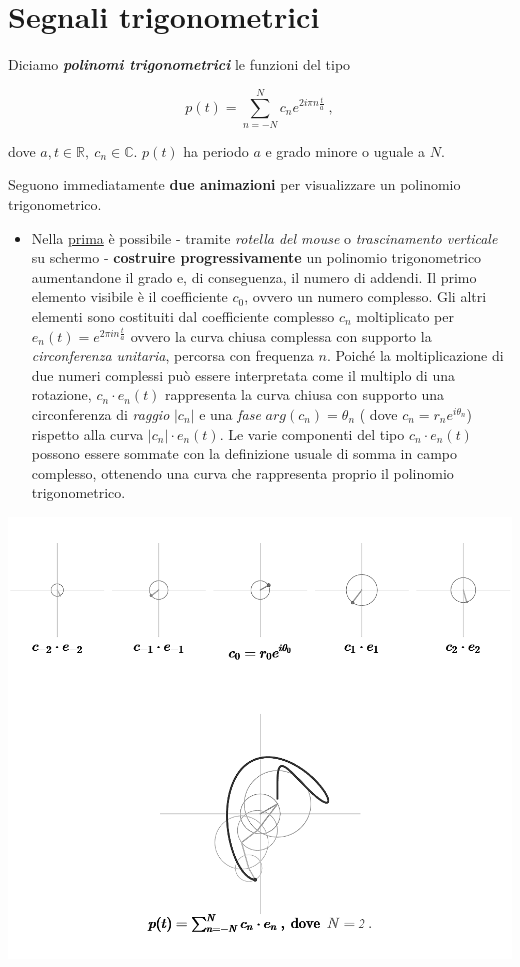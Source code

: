 \documentclass[
]{book}
\providecommand{\tightlist}{%
  \setlength{\itemsep}{0pt}\setlength{\parskip}{0pt}}
\begin{document}
\hypertarget{segntrig}{%
\section{Segnali trigonometrici}\label{segntrig}}

Diciamo \emph{\textbf{polinomi trigonometrici}} le funzioni del tipo

\begin{equation}
  p(t) = \sum_{n=-N}^N c_n e^{2 i \pi n \textstyle \frac {t}{a}} \ ,
  \label{eq:poltrig}
\end{equation}

dove \(a,t \in \mathbb{R}, \ c_n \in \mathbb{C}\). \(p(t)\) ha periodo \(a\) e grado minore o uguale a \(N\).

Seguono immediatamente \textbf{due animazioni} per visualizzare un polinomio trigonometrico.

\begin{itemize}
\tightlist
\item
  Nella \href{https://bradwave.github.io/thesis/animations/s2-animation.html}{prima} è possibile - tramite \emph{rotella del mouse} o \emph{trascinamento verticale} su schermo - \textbf{costruire progressivamente} un polinomio trigonometrico aumentandone il grado e, di conseguenza, il numero di addendi.
  Il primo elemento visibile è il coefficiente \(c_0\), ovvero un numero complesso. Gli altri elementi sono costituiti dal coefficiente complesso \(c_n\) moltiplicato per \(e_n(t)=e^{2\pi in\frac{t}{a}}\) ovvero la curva chiusa complessa con supporto la \emph{circonferenza unitaria}, percorsa con frequenza \(n\). Poiché la moltiplicazione di due numeri complessi può essere interpretata come il multiplo di una rotazione, \(c_n \cdot e_n(t)\) rappresenta la curva chiusa con supporto una circonferenza di \emph{raggio} \(|c_n|\) e una \emph{fase} \(arg(c_n)=\theta_n\) ( dove \(c_n=r_{n}e^{i\theta_n}\)) rispetto alla curva \(|c_n| \cdot e_n(t)\).
  Le varie componenti del tipo \(c_n \cdot e_n(t)\) possono essere sommate con la definizione usuale di somma in campo complesso, ottenendo una curva che rappresenta proprio il polinomio trigonometrico.
\end{itemize}

\begin{center}\includegraphics[width=0.8\linewidth]{_images/pol-trig} \end{center}
\end{document}
